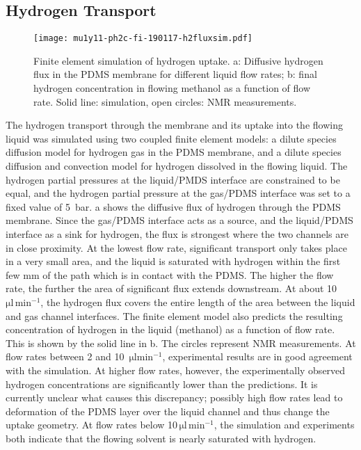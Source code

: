 \newpage

\subsection{Hydrogen Transport}

\begin{figure}
  \begin{center}
	\texttt{[image: mu1y11-ph2c-fi-190117-h2fluxsim.pdf]}
  \end{center}
	\caption{
		Finite element simulation of hydrogen uptake. a: Diffusive hydrogen
		flux in the PDMS membrane for different liquid flow rates;
		b: final hydrogen concentration in flowing methanol as a function of
		flow rate. Solid line: simulation, open circles: NMR measurements.
	}
	\label{fig:h2fluxsim}
\end{figure}

The hydrogen transport through the membrane and its uptake into the flowing
liquid was simulated using two coupled finite element models: a dilute species
diffusion model for hydrogen gas in the PDMS membrane, and a dilute species
diffusion and convection model for hydrogen dissolved in the flowing liquid. The
hydrogen partial pressures at the liquid/PMDS interface are constrained to be
equal, and the hydrogen partial pressure at the gas/PDMS interface was set to a
fixed value of 5~bar. a shows the diffusive flux of hydrogen
through the PDMS membrane.  Since the gas/PDMS interface acts as a source, and
the liquid/PDMS interface as a sink for hydrogen, the flux is strongest where
the two channels are in close proximity. At the lowest flow rate, significant
transport only takes place in a very small area, and the liquid is saturated
with hydrogen within the first few mm of the path which is in contact with the
PDMS. The higher the flow rate, the further the area of significant flux extends
downstream. At about 10~$\mathrm{\mu l \,min^{-1}}$, the hydrogen flux covers
the entire length of the area between the liquid and gas channel interfaces. The
finite element model also predicts the resulting concentration of hydrogen in
the liquid (methanol) as a function of flow rate. This is shown by the solid
line in  b. The circles represent NMR measurements. At
flow rates between 2 and 10~$\mathrm{\mu l min^{-1}}$, experimental results are
in good agreement with the simulation. At higher flow rates, however, the
experimentally observed hydrogen concentrations are significantly lower than the
predictions. It is currently unclear what causes this discrepancy; possibly high
flow rates lead to deformation of the PDMS layer over the liquid channel and
thus change the uptake geometry. At flow rates below 10$\,\mathrm{\mu l
\,min^{-1}}$, the simulation and experiments both indicate that the flowing
solvent is nearly saturated with hydrogen.


